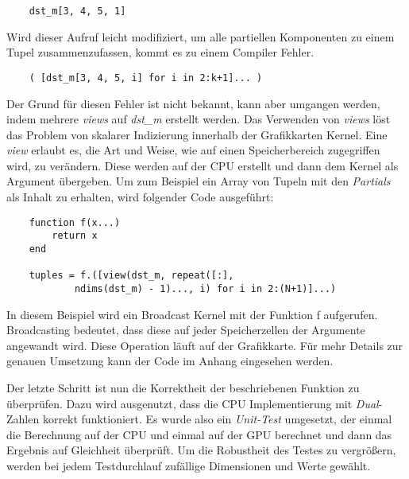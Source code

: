 \begin{verbatim}
    dst_m[3, 4, 5, 1]
\end{verbatim}
Wird dieser Aufruf leicht modifiziert, um alle partiellen Komponenten zu einem Tupel zusammenzufassen, 
kommt es zu einem Compiler Fehler.
\begin{verbatim}
    ( [dst_m[3, 4, 5, i] for i in 2:k+1]... )
\end{verbatim}
Der Grund für diesen Fehler ist nicht bekannt, kann aber umgangen werden, indem mehrere \textit{views} auf
\textit{dst\_m} erstellt werden.
Das Verwenden von \textit{views} löst das Problem von skalarer Indizierung innerhalb der Grafikkarten Kernel. 
Eine \textit{view} erlaubt es, die Art und Weise, wie auf einen Speicherbereich zugegriffen wird, zu verändern.
Diese werden auf der CPU erstellt und dann dem Kernel als Argument übergeben.
Um zum Beispiel ein Array von Tupeln mit den \textit{Partials} als Inhalt zu erhalten, wird folgender Code ausgeführt:
\begin{verbatim}
	function f(x...)
		return x
	end
	
	tuples = f.([view(dst_m, repeat([:], 
	        ndims(dst_m) - 1)..., i) for i in 2:(N+1)]...)
\end{verbatim}
In diesem Beispiel wird ein Broadcast Kernel mit der Funktion f aufgerufen.
Broadcasting bedeutet, dass diese auf jeder Speicherzellen der Argumente angewandt wird.
Diese Operation läuft auf der Grafikkarte.
Für mehr Details zur genauen Umsetzung kann der Code im Anhang eingesehen werden.


Der letzte Schritt ist nun die Korrektheit der beschriebenen Funktion zu 
überprüfen. Dazu wird ausgenutzt, dass die CPU Implementierung mit \textit{Dual}-Zahlen korrekt funktioniert.
Es wurde also ein \textit{Unit-Test} umgesetzt, der einmal die Berechnung 
auf der CPU und einmal auf der GPU berechnet und dann das Ergebnis
auf Gleichheit überprüft.
Um die Robustheit des Testes zu vergrößern, werden bei jedem Testdurchlauf zufällige Dimensionen und Werte gewählt.